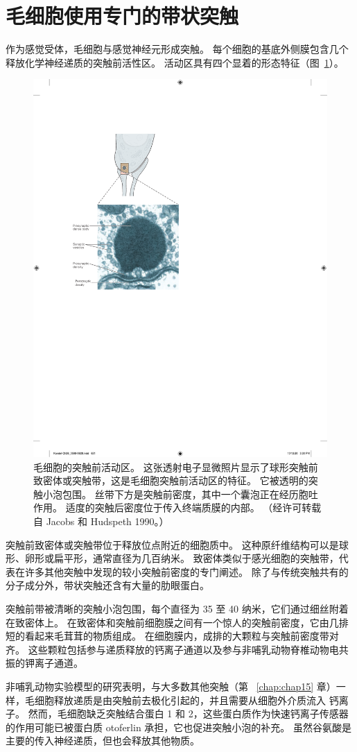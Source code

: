 \section{毛细胞使用专门的带状突触}

作为感觉受体，毛细胞与感觉神经元形成突触。
每个细胞的基底外侧膜包含几个释放化学神经递质的突触前活性区。
活动区具有四个显着的形态特征（图~\ref{fig:26_16}）。


\begin{figure}[htbp]
	\centering
	\includegraphics[width=0.5\linewidth]{chap26/fig_26_16}
	\caption{毛细胞的突触前活动区。 这张透射电子显微照片显示了球形突触前致密体或突触带，这是毛细胞突触前活动区的特征。 它被透明的突触小泡包围。 丝带下方是突触前密度，其中一个囊泡正在经历胞吐作用。 适度的突触后密度位于传入终端质膜的内部。 （经许可转载自 Jacobs 和 Hudspeth 1990。）}
	\label{fig:26_16}
\end{figure}


突触前致密体或突触带位于释放位点附近的细胞质中。
这种原纤维结构可以是球形、卵形或扁平形，通常直径为几百纳米。
致密体类似于感光细胞的突触带，代表在许多其他突触中发现的较小突触前密度的专门阐述。
除了与传统突触共有的分子成分外，带状突触还含有大量的肋眼蛋白。


突触前带被清晰的突触小泡包围，每个直径为 35 至 40 纳米，它们通过细丝附着在致密体上。
在致密体和突触前细胞膜之间有一个惊人的突触前密度，它由几排短的看起来毛茸茸的物质组成。
在细胞膜内，成排的大颗粒与突触前密度带对齐。
这些颗粒包括参与递质释放的钙离子通道以及参与非哺乳动物脊椎动物电共振的钾离子通道。


非哺乳动物实验模型的研究表明，与大多数其他突触（第 ~\ref{chap:chap15} 章）一样，毛细胞释放递质是由突触前去极化引起的，并且需要从细胞外介质流入 钙离子。
然而，毛细胞缺乏突触结合蛋白 1 和 2，这些蛋白质作为快速钙离子传感器的作用可能已被蛋白质 otoferlin 承担，它也促进突触小泡的补充。
虽然谷氨酸是主要的传入神经递质，但也会释放其他物质。


